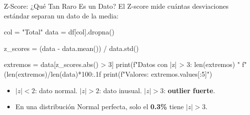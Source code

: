 \documentclass[aspectratio=169, 11pt]{beamer}
\begin{document}
\begin{frame}[fragile,shrink=28]{Z-Score: ¿Qué Tan Raro Es un Dato?}
  \vspace{-6pt}
  {\footnotesize
    El Z-score mide cuántas desviaciones estándar separan un dato de la media:}

  \vspace{2pt}
  \begin{center}
  \end{center}

  \vspace{2pt}
  \begin{pyblock}
col = "Total"
data = df[col].dropna()

z_scores = (data - data.mean()) / data.std()

extremos = data[z_scores.abs() > 3]
print(f"Datos con |z| > 3: {len(extremos)} "
      f"({len(extremos)/len(data)*100:.1f}%
print(f"Valores: {extremos.values[:5]}")
  \end{pyblock}

  \vspace{4pt}
  {\scriptsize\color{textMuted}
  \begin{itemize}\setlength{\itemsep}{3pt}
    \item[{\color{codeGreen}\scriptsize\faCheckCircle}]
      $|z| < 2$: dato normal. \quad
      $|z| > 2$: dato inusual. \quad
      $|z| > 3$: \textbf{outlier fuerte}.
    \item[{\color{arcaRed}\scriptsize\faArrowRight}]
      En una distribución Normal perfecta, solo el \textbf{0.3\%} tiene $|z| > 3$.
  \end{itemize}
  }
\end{frame}
\end{document}

